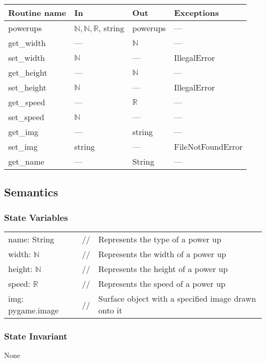 \documentclass[12pt]{article}
\begin{document}
\begin{tabular}{| l | l | l | l |}
\hline
\textbf{Routine name} & \textbf{In} & \textbf{Out} & \textbf{Exceptions}\\
\hline
    powerups & $\mathbb{N, N, R}$, string & powerups & ---\\
\hline
    get\_width & --- & $\mathbb{N}$ & ---\\
\hline
    set\_width & $\mathbb{N}$ & --- & IllegalError\\
\hline
    get\_height & --- & $\mathbb{N}$ & ---\\
\hline
    set\_height & $\mathbb{N}$ & --- & IllegalError\\
\hline
    get\_speed & --- & $\mathbb{R}$ & --- \\
\hline
    set\_speed & $\mathbb{N}$ & ---& --- \\
\hline
    get\_img & --- & string & ---\\
\hline
    set\_img & string & --- & FileNotFoundError\\
\hline
    get\_name & --- & String & --- \\
\hline
\end{tabular}

\subsection* {Semantics}

\subsubsection* {State Variables}
\begin{tabular}{lll}
name: String & // & Represents the type of a power up\\
    width: $\mathbb{N}$ & // & Represents the width of a power up\\
    height: $\mathbb{N}$ & // & Represents the height of a power up\\
    speed: $\mathbb{R}$ & // & Represents the speed of a power up\\
    img: pygame.image & // & Surface object with a specified image drawn onto it\\
\end{tabular}

\subsubsection* {State Invariant}

None
\end{document}
